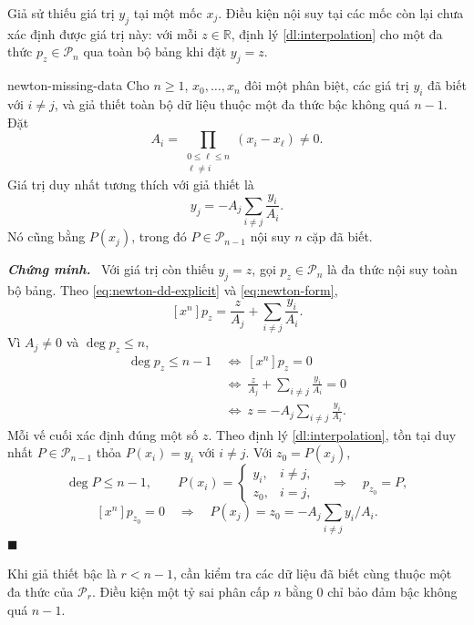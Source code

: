 \documentclass[12pt,a4paper,oneside]{book}
\numberwithin{algorithm}{chapter}
\theoremstyle{definition}
\newenvironment{chungminh}{\par\medskip\noindent\textbf{\textit{\color{mainblue}Chứng minh.}}\ }{\hfill$\blacksquare$\par\medskip}
\newcommand{\R}{\mathbb{R}}
\begin{document}
Giả sử thiếu giá trị $y_j$ tại một mốc $x_j$. Điều kiện nội suy tại các mốc còn lại chưa xác định được giá trị này: với mỗi $z\in\R$, định lý \ref{dl:interpolation} cho một đa thức $p_z\in\mathcal P_n$ qua toàn bộ bảng khi đặt $y_j=z$.
\begin{menhde}{}{newton-missing-data}
Cho $n\geq1$, $x_0,\ldots,x_n$ đôi một phân biệt, các giá trị $y_i$ đã biết với $i\ne j$, và giả thiết toàn bộ dữ liệu thuộc một đa thức bậc không quá $n-1$. Đặt
\[
 A_i=\prod_{\substack{0\leq\ell\leq n\\\ell\ne i}}(x_i-x_\ell)\ne0.
\]
Giá trị duy nhất tương thích với giả thiết là
\begin{equation}\label{eq:newton-missing-value}
 y_j=-A_j\sum_{i\ne j}\frac{y_i}{A_i}.
\end{equation}
Nó cũng bằng $P(x_j)$, trong đó $P\in\mathcal P_{n-1}$ nội suy $n$ cặp đã biết.
\end{menhde}
\begin{chungminh}
Với giá trị còn thiếu $y_j=z$, gọi $p_z\in\mathcal P_n$ là đa thức nội suy toàn bộ bảng. Theo \eqref{eq:newton-dd-explicit} và \eqref{eq:newton-form},
\[
 [x^n]p_z=\frac z{A_j}+\sum_{i\ne j}\frac{y_i}{A_i}.
\]
Vì $A_j\ne0$ và $\deg p_z\leq n$,
\begin{align*}
 \deg p_z\leq n-1
 &\ \Longleftrightarrow\ [x^n]p_z=0\\
 &\ \Longleftrightarrow\ \frac z{A_j}+\sum_{i\ne j}\frac{y_i}{A_i}=0\\
 &\ \Longleftrightarrow\ z=-A_j\sum_{i\ne j}\frac{y_i}{A_i}.
\end{align*}
Mỗi vế cuối xác định đúng một số $z$. Theo định lý \ref{dl:interpolation}, tồn tại duy nhất $P\in\mathcal P_{n-1}$ thỏa $P(x_i)=y_i$ với $i\ne j$. Với $z_0=P(x_j)$,
\[
 \deg P\leq n-1,\qquad
 P(x_i)=\begin{cases}y_i,&i\ne j,\\z_0,&i=j,\end{cases}
 \quad\Longrightarrow\quad p_{z_0}=P,
\]
\[
 [x^n]p_{z_0}=0
 \quad\Longrightarrow\quad
 P(x_j)=z_0=-A_j\sum_{i\ne j}y_i/A_i.
\]
\end{chungminh}
Khi giả thiết bậc là $r<n-1$, cần kiểm tra các dữ liệu đã biết cùng thuộc một đa thức của $\mathcal P_r$. Điều kiện một tỷ sai phân cấp $n$ bằng $0$ chỉ bảo đảm bậc không quá $n-1$.

\end{document}
